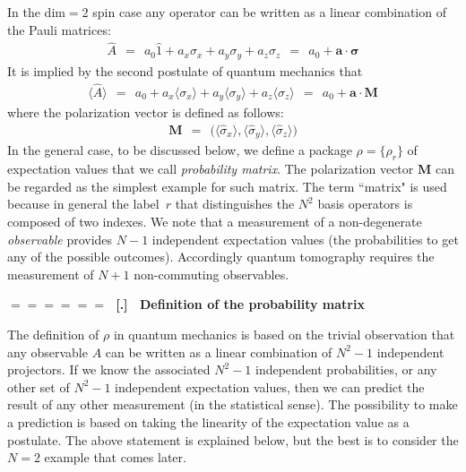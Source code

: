 \documentclass[onecolumn,fleqn]{revtex4}
\newcommand{\beq}{\begin{eqnarray}}
\newcommand{\eeq}{\end{eqnarray}}
\renewcommand{\thesubsection}{\arabic{subsection}}
\renewcommand{\thesubsubsection}{\arabic{subsubsection}}
\newcommand{\sheadC}[1]
{
\addtocounter{subsubsection}{1}
\vspace{5mm}
{\Large\bf $=\!=\!=\!=\!=\!=\;$ [\thesubsection.\thesubsubsection] \ #1}  
\nopagebreak
\phantomsection
}
\begin{document}
In the dim$=2$ spin case any operator can be written 
as a linear combination of the Pauli matrices:
\beq
\hat{A} \ \ = \ \ a_0 \hat{1} + a_x \sigma_x + a_y \sigma_y + a_z \sigma_z \ \ = \ \ a_0 + \bm{a} \cdot \bm{\sigma}
\eeq
It is implied by the second postulate of quantum mechanics that 
\beq
\langle\hat{A}\rangle \ \ = \ \ a_0  + a_x \langle \sigma_x \rangle + a_y \langle \sigma_y \rangle + a_z \langle \sigma_z \rangle
\ \ = \ \  a_0+\bm{a}\cdot\bm{M}
\eeq
where the polarization vector is defined as follows:
\beq
\bm{M} \ \ = \ \ \Big(\langle\hat{\sigma}_x\rangle, \langle\hat{\sigma}_y\rangle, \langle\hat{\sigma}_z\rangle\Big)
\eeq
In the general case, to be discussed below, 
we define a package ${\rho=\{\rho_r\}}$ of expectation values 
that we call {\em probability matrix}. 
The polarization vector $\bm{M}$ can be regarded as the simplest 
example for such matrix. The term ``matrix" is used because 
in general the label~$r$ that distinguishes the $N^2$ basis operators 
is composed of two indexes. We note that a measurement of 
a non-degenerate {\em observable} provides $N{-}1$ independent  
expectation values (the probabilities to get any of the possible outcomes).
Accordingly quantum tomography requires the measurement of $N{+}1$ non-commuting observables.      

 
\sheadC{Definition of the probability matrix} 

The definition of ${\rho}$ in quantum mechanics 
is based on the trivial observation that 
any observable $A$ can be written as a linear 
combination of ${N^2{-}1}$ independent projectors. 
If we know the associated ${N^2{-}1}$ independent probabilities,  
or any other set of ${N^2{-}1}$ independent expectation values,   
then we can predict the result of any other measurement (in the statistical sense). 
The possibility to make a prediction is based 
on taking the linearity of the expectation value as a postulate.
The above statement is explained below, but the best 
is to consider the $N=2$ example that comes later.  
\end{document}
